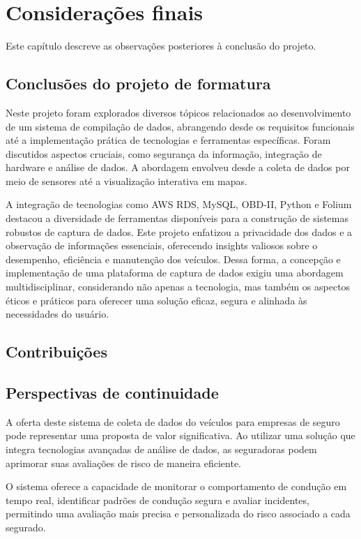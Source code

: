 \chapter{Considerações finais}

Este capítulo descreve as observações posteriores à conclusão do projeto.

\section{Conclusões do projeto de formatura}
Neste projeto foram explorados diversos tópicos relacionados ao desenvolvimento de um sistema de compilação de dados, abrangendo desde os requisitos funcionais até a implementação prática de tecnologias e ferramentas específicas. Foram discutidos aspectos cruciais, como segurança da informação, integração de hardware e análise de dados. A abordagem envolveu desde a coleta de dados por meio de sensores até a visualização interativa em mapas. 

A integração de tecnologias como AWS RDS, MySQL, OBD-II, Python e Folium destacou a diversidade de ferramentas disponíveis para a construção de sistemas robustos de captura de dados. Este projeto enfatizou a privacidade dos dados e a  observação de informações essenciais, oferecendo insights valiosos sobre o desempenho, eficiência e manutenção dos veículos. Dessa forma, a concepção e implementação de uma plataforma de captura de dados exigiu uma abordagem multidisciplinar, considerando não apenas a tecnologia, mas também os aspectos éticos e práticos para oferecer uma solução eficaz, segura e alinhada às necessidades do usuário.

\section{Contribuições}

\section{Perspectivas de continuidade}
A oferta deste sistema de coleta de dados do veículos para empresas de seguro pode representar uma proposta de valor significativa. Ao utilizar uma solução que integra tecnologias avançadas de análise de dados, as seguradoras podem aprimorar suas avaliações de risco de maneira eficiente. 

O sistema oferece a capacidade de monitorar o comportamento de condução em tempo real, identificar padrões de condução segura e avaliar incidentes, permitindo uma avaliação mais precisa e personalizada do risco associado a cada segurado. 

